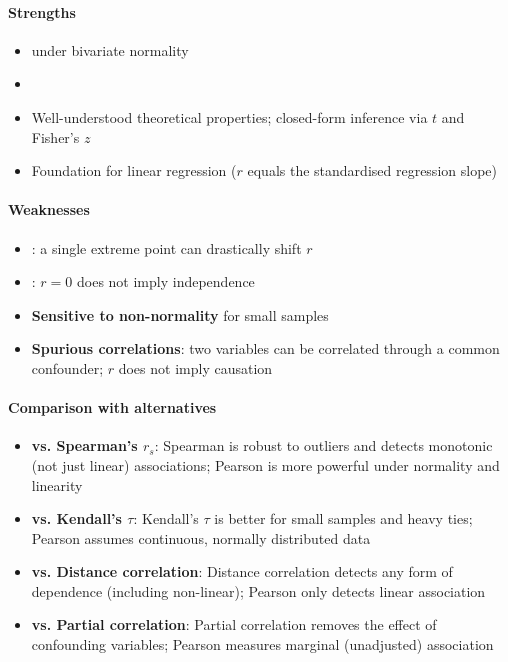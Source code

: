 \paragraph{Strengths}
\begin{itemize}
    \item {} under bivariate normality
    \item {}
    \item Well-understood theoretical properties; closed-form inference via $t$ and
        Fisher's $z$
    \item Foundation for linear regression ($r$ equals the standardised regression slope)
\end{itemize}

\paragraph{Weaknesses}
\begin{itemize}
    \item {}: a single extreme point can drastically shift $r$
    \item {}: $r = 0$ does not imply independence
    \item \textbf{Sensitive to non-normality} for small samples
    \item \textbf{Spurious correlations}: two variables can be correlated through a common
        confounder; $r$ does not imply causation
\end{itemize}

\paragraph{Comparison with alternatives}
\begin{itemize}
    \item \textbf{vs. Spearman's $r_s$}: Spearman is robust to outliers and detects
        monotonic (not just linear) associations; Pearson is more powerful under
        normality and linearity
    \item \textbf{vs. Kendall's $\tau$}: Kendall's $\tau$ is better for small samples
        and heavy ties; Pearson assumes continuous, normally distributed data
    \item \textbf{vs. Distance correlation}: Distance correlation detects any form of
        dependence (including non-linear); Pearson only detects linear association
    \item \textbf{vs. Partial correlation}: Partial correlation removes the effect of
        confounding variables; Pearson measures marginal (unadjusted) association
\end{itemize}

